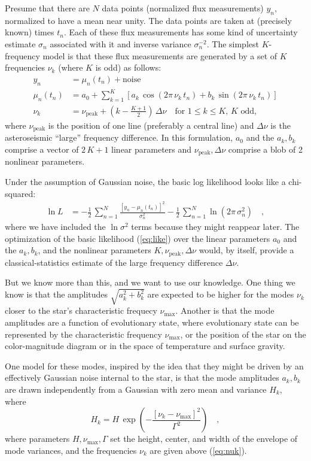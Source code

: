 \documentclass[modern]{aastex63}
\newcommand{\nupeak}{\nu_\mathrm{peak}}
\newcommand{\numax}{\nu_\mathrm{max}}
\begin{document}
Presume that there are $N$ data points (normalized flux measurements)
$y_n$, normalized to have a mean near unity.
The data points are taken at (precisely known) times $t_n$.
Each of these flux measurements has some kind of uncertainty estimate
$\sigma_n$ associated with it and inverse variance $\sigma_n^{-2}$.
The simplest $K$-frequency model is that these flux measurements are
generated by a set of $K$ frequencies $\nu_k$ (where $K$ is odd) as follows:
\begin{align}
  y_n &= \mu_n(t_n) + \mbox{noise}
  \\
  \mu_n(t_n) &= a_0 + \sum_{k=1}^K \left[a_k\,\cos(2\pi\,\nu_k\,t_n) + b_k\,\sin(2\pi\,\nu_k\,t_n)\right]
  \\ \label{eq:nuk}
  \nu_k &= \nupeak + \left(k - \frac{K + 1}{2}\right)\,\Delta\nu
  \quad \mbox{for $1\leq k\leq K$, $K$ odd,}
\end{align}
where $\nupeak$ is the position of one line (preferably a central line)
and $\Delta\nu$ is the asteroseismic ``large'' frequency difference.
In this formulation, $a_0$ and the $a_k,b_k$ comprise a vector of
$2\,K+1$ linear parameters and $\nupeak, \Delta\nu$ comprise a
blob of 2 nonlinear parameters.

Under the assumption of Gaussian noise, the basic log likelihood looks like a
chi-squared:
\begin{align}\label{eq:like}
  \ln L &= -\frac{1}{2}\,\sum_{n=1}^N \frac{[y_n - \mu_n(t_n)]^2}{\sigma_n^2}
           -\frac{1}{2}\,\sum_{n=1}^N \ln(2\pi\,\sigma_n^2)
  \quad,
\end{align}
where we have included the $\ln\sigma^2$ terms because they might reappear later.
The optimization of the basic likelihood (\ref{eq:like})
over the linear parameters $a_0$ and the $a_k, b_k$, and the nonlinear
parameters $K, \nupeak, \Delta\nu$ would, by itself, provide a
classical-statistics estimate of the large frequency difference
$\Delta\nu$.

But we know more than this, and we want to use our knowledge.
One thing we know is that the amplitudes $\sqrt{a_k^2+b_k^2}$
are expected to be higher for the
modes $\nu_k$ closer to the star's characteristic frequecy $\numax$.
Another is that the mode amplitudes are a function of evolutionary
state, where evolutionary state can be represented by the characteristic
frequency $\numax$, or the position of
the star on the color-magnitude diagram or in the space of temperature
and surface gravity.

One model for these modes, inspired by the idea that they might be driven
by an effectively Gaussian noise internal to the star, is that the mode
amplitudes $a_k, b_k$ are drawn independently from a Gaussian with zero
mean and variance $H_k$, where
\begin{equation}\label{eq:bell}
  H_k = H\,\exp(- \frac{[\nu_k - \numax]^2}{\Gamma^2})
  \quad ,
\end{equation}
where parameters $H, \numax, \Gamma$ set the height, center, and width of
the envelope of mode variances, and the frequencies $\nu_k$ are given
above (\ref{eq:nuk}).
\end{document}
